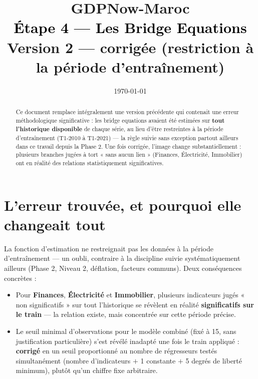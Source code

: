 \documentclass[11pt,a4paper]{article}
\title{\vspace{-1.3cm}\textcolor{bleuprincip}{\Huge\bfseries GDPNow-Maroc}\\[0.3cm]
\textcolor{black}{\Large Étape 4 --- Les Bridge Equations}\\[0.15cm]
\textcolor{orangealerte}{\large Version 2 --- corrigée (restriction à la période d'entraînement)}}
\author{}
\date{\today}
\begin{document}
\maketitle
\thispagestyle{empty}

\begin{abstract}
\noindent Ce document remplace intégralement une version précédente qui contenait une erreur méthodologique significative : les bridge equations avaient été estimées sur \textbf{tout l'historique disponible} de chaque série, au lieu d'être restreintes à la période d'entraînement (T1-2010 à T1-2021) --- la règle suivie sans exception partout ailleurs dans ce travail depuis la Phase 2. Une fois corrigée, l'image change substantiellement : plusieurs branches jugées à tort « sans aucun lien » (Finances, Électricité, Immobilier) ont en réalité des relations statistiquement significatives.
\end{abstract}

\tableofcontents
\vspace{0.5cm}

\section{L'erreur trouvée, et pourquoi elle changeait tout}

\begin{alertebox}
La fonction d'estimation ne restreignait pas les données à la période d'entraînement --- un oubli, contraire à la discipline suivie systématiquement ailleurs (Phase 2, Niveau 2, déflation, facteurs communs). Deux conséquences concrètes :
\begin{itemize}[leftmargin=1.3em]
\item Pour \textbf{Finances}, \textbf{Électricité} et \textbf{Immobilier}, plusieurs indicateurs jugés « non significatifs » sur tout l'historique se révèlent en réalité \textbf{significatifs sur le train} --- la relation existe, mais concentrée sur cette période précise.
\item Le seuil minimal d'observations pour le modèle combiné (fixé à 15, sans justification particulière) s'est révélé inadapté une fois le train appliqué : \textbf{corrigé} en un seuil proportionné au nombre de régresseurs testés simultanément (nombre d'indicateurs $+$ 1 constante $+$ 5 degrés de liberté minimum), plutôt qu'un chiffre fixe arbitraire.
\end{itemize}
\end{alertebox}
\end{document}
